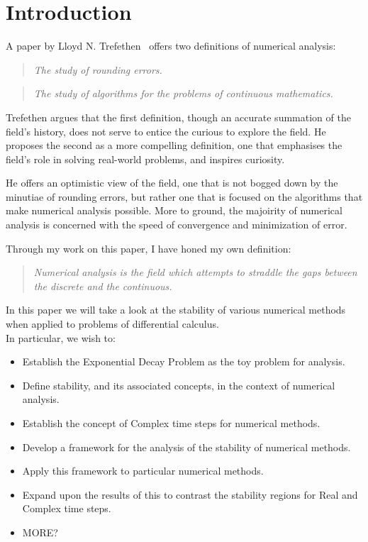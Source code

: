 \section{Introduction}
\par A paper by Lloyd N. Trefethen~\cite{trefethen_definition} offers two definitions of numerical analysis:
\begin{quote}
    \textit{The study of rounding errors.}
\end{quote}
\begin{quote}
    \textit{The study of algorithms for the problems of continuous mathematics.}
\end{quote}

\par Trefethen argues that the first definition, though an accurate summation of the field's history, does not serve to entice the curious to explore the field. He proposes the second as a more compelling definition, one that emphasises the field's role in solving real-world problems, and inspires curiosity.

\par He offers an optimistic view of the field, one that is not bogged down by the minutiae of rounding errors, but rather one that is focused on the algorithms that make numerical analysis possible. More to ground, the majoirity of numerical analysis is concerned with the speed of convergence and minimization of error.

Through my work on this paper, I have honed my own definition:
\begin{quote}
	\textit{Numerical analysis is the field which attempts to straddle the gaps between the discrete and the continuous.}
\end{quote}

In this paper we will take a look at the stability of various numerical methods when applied to problems of differential calculus.\\
In particular, we wish to:
\begin{itemize}
	\item Establish the Exponential Decay Problem as the toy problem for analysis.
	\item Define stability, and its associated concepts, in the context of numerical analysis.
	\item Establish the concept of Complex time steps for numerical methods.
	\item Develop a framework for the analysis of the stability of numerical methods.
	\item Apply this framework to particular numerical methods.
	\item Expand upon the results of this to contrast the stability regions for Real and Complex time steps.
	\item MORE?
\end{itemize}
